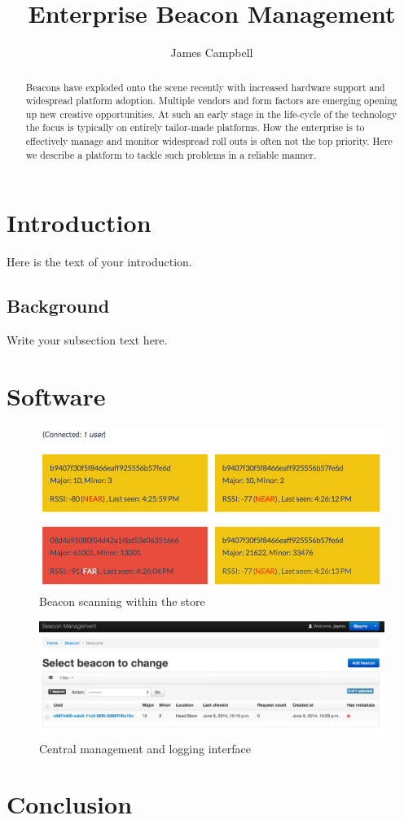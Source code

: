\documentclass{article}
\begin{document}
\title{Enterprise Beacon Management}
\author{James Campbell}

\maketitle

\begin{abstract}
Beacons have exploded onto the scene recently with increased hardware support and widespread platform adoption. Multiple vendors and form factors are emerging opening up new creative opportunities. At such an early stage in the life-cycle of the technology the focus is typically on entirely tailor-made platforms. How the enterprise is to effectively manage and monitor widespread roll outs is often not the top priority. Here we describe a platform to tackle such problems in a reliable manner.
\end{abstract}

\section{Introduction}
Here is the text of your introduction.

\subsection{Background}
Write your subsection text here.

\section{Software}

\begin{figure}
    \centering
    \includegraphics[width=\textwidth]{images/scanning.png}
    \caption{Beacon scanning within the store}
    \label{simulationfigure}
\end{figure}

\begin{figure}
    \centering
    \includegraphics[width=\textwidth]{images/management.png}
    \caption{Central management and logging interface}
    \label{simulationfigure}
\end{figure}

\section{Conclusion}
\end{document}

